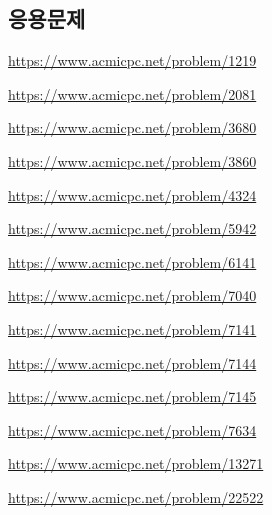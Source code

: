 \subsection{응용문제}
\begin{problem} \url{https://www.acmicpc.net/problem/1219} \end{problem}
\begin{problem} \url{https://www.acmicpc.net/problem/2081} \end{problem}
\begin{problem} \url{https://www.acmicpc.net/problem/3680} \end{problem}
\begin{problem} \url{https://www.acmicpc.net/problem/3860} \end{problem}
\begin{problem} \url{https://www.acmicpc.net/problem/4324} \end{problem}
\begin{problem} \url{https://www.acmicpc.net/problem/5942} \end{problem}
\begin{problem} \url{https://www.acmicpc.net/problem/6141} \end{problem}
\begin{problem} \url{https://www.acmicpc.net/problem/7040} \end{problem}
\begin{problem} \url{https://www.acmicpc.net/problem/7141} \end{problem}
\begin{problem} \url{https://www.acmicpc.net/problem/7144} \end{problem}
\begin{problem} \url{https://www.acmicpc.net/problem/7145} \end{problem}
\begin{problem} \url{https://www.acmicpc.net/problem/7634} \end{problem}
\begin{problem} \url{https://www.acmicpc.net/problem/13271} \end{problem}
\begin{problem} \url{https://www.acmicpc.net/problem/22522} \end{problem}

